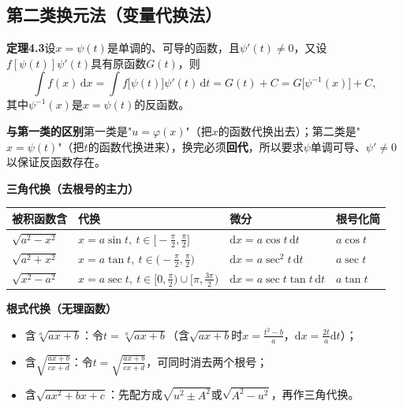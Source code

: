 
\subsection{第二类换元法（变量代换法）}

\noindent\textbf{定理4.3}\quad 设$x=\psi(t)$是单调的、可导的函数，且$\psi'(t)\neq0$，又设$f[\psi(t)]\psi'(t)$具有原函数$G(t)$，则
\[
\int f(x)\,\mathrm{d}x=\int f\bigl[\psi(t)\bigr]\psi'(t)\,\mathrm{d}t=G(t)+C=G\bigl[\psi^{-1}(x)\bigr]+C ,
\]
其中$\psi^{-1}(x)$是$x=\psi(t)$的反函数。

\noindent\textbf{与第一类的区别}\quad 第一类是"$u=\varphi(x)$"（把$x$的函数代换出去）；第二类是"$x=\psi(t)$"（把$t$的函数代换进来），换完必须\textbf{回代}，所以要求$\psi$单调可导、$\psi'\neq0$以保证反函数存在。

\noindent\textbf{三角代换（去根号的主力）}
\begin{center}
\begin{tabular}{@{}llll@{}}
\toprule
被积函数含 & 代换 & 微分 & 根号化简 \\
\midrule
$\sqrt{a^2-x^2}$ & $x=a\sin t,\ t\in\bigl[-\frac{\pi}{2},\frac{\pi}{2}\bigr]$ & $\mathrm{d}x=a\cos t\,\mathrm{d}t$ & $a\cos t$ \\
$\sqrt{a^2+x^2}$ & $x=a\tan t,\ t\in\bigl(-\frac{\pi}{2},\frac{\pi}{2}\bigr)$ & $\mathrm{d}x=a\sec^2t\,\mathrm{d}t$ & $a\sec t$ \\
$\sqrt{x^2-a^2}$ & $x=a\sec t,\ t\in\bigl[0,\frac{\pi}{2}\bigr)\cup\bigl[\pi,\frac{3\pi}{2}\bigr)$ & $\mathrm{d}x=a\sec t\tan t\,\mathrm{d}t$ & $a\tan t$ \\
\bottomrule
\end{tabular}
\end{center}

\noindent\textbf{根式代换（无理函数）}
\begin{itemize}
  \item 含$\sqrt[n]{ax+b}$：令$t=\sqrt[n]{ax+b}$（含$\sqrt{ax+b}$时$x=\frac{t^2-b}{a}$，$\mathrm{d}x=\frac{2t}{a}\mathrm{d}t$）；
  \item 含$\sqrt{\frac{ax+b}{cx+d}}$：令$t=\sqrt{\frac{ax+b}{cx+d}}$，可同时消去两个根号；
  \item 含$\sqrt{ax^2+bx+c}$：先配方成$\sqrt{u^2\pm A^2}$或$\sqrt{A^2-u^2}$，再作三角代换。
\end{itemize}

